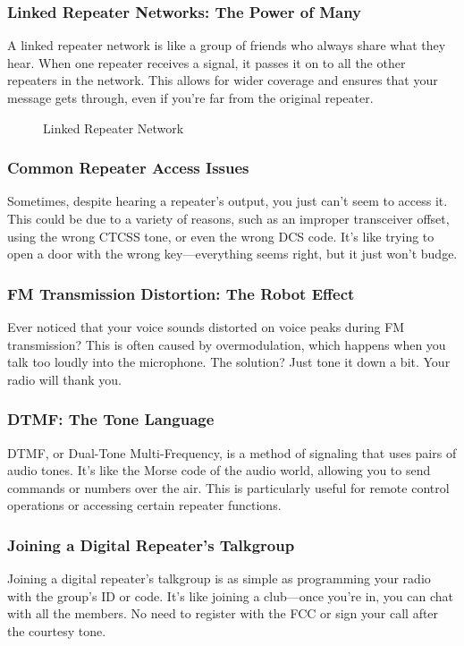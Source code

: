 \subsubsection*{Linked Repeater Networks: The Power of Many}
A linked repeater network is like a group of friends who always share what they hear. When one repeater receives a signal, it passes it on to all the other repeaters in the network. This allows for wider coverage and ensures that your message gets through, even if you're far from the original repeater.

\begin{figure}[h]
    \centering
    \caption{Linked Repeater Network}
    \label{fig:linked-repeater}
\end{figure}

\subsubsection*{Common Repeater Access Issues}
Sometimes, despite hearing a repeater's output, you just can't seem to access it. This could be due to a variety of reasons, such as an improper transceiver offset, using the wrong CTCSS tone, or even the wrong DCS code. It's like trying to open a door with the wrong key—everything seems right, but it just won't budge.

\subsubsection*{FM Transmission Distortion: The Robot Effect}
Ever noticed that your voice sounds distorted on voice peaks during FM transmission? This is often caused by overmodulation, which happens when you talk too loudly into the microphone. The solution? Just tone it down a bit. Your radio will thank you.

\subsubsection*{DTMF: The Tone Language}
DTMF, or Dual-Tone Multi-Frequency, is a method of signaling that uses pairs of audio tones. It's like the Morse code of the audio world, allowing you to send commands or numbers over the air. This is particularly useful for remote control operations or accessing certain repeater functions.

\subsubsection*{Joining a Digital Repeater's Talkgroup}
Joining a digital repeater's talkgroup is as simple as programming your radio with the group's ID or code. It's like joining a club—once you're in, you can chat with all the members. No need to register with the FCC or sign your call after the courtesy tone.

